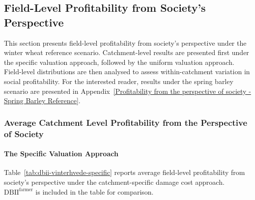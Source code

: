 \documentclass[12pt]{article}
\begin{document}
\subsection{Field-Level Profitability from Society's Perspective}
\label{sec:society-profitability}

This section presents field-level profitability from society's perspective under the winter wheat reference scenario. 
Catchment-level results are presented first under the specific valuation approach, followed by the uniform valuation approach. Field-level distributions are then analysed to assess within-catchment variation in social profitability. For the interested reader, results under the spring barley scenario are presented in Appendix~\ref{Profitability from the perspective of society - Spring Barley Reference}.


\subsubsection{Average Catchment Level Profitability from the Perspective of Society}

\paragraph{The Specific Valuation Approach} Table~\ref{tab:dbii-vinterhvede-specific} reports average field-level profitability from society's perspective under the catchment-specific damage cost approach. $\mathrm{DBII^{farmer}}$ is included in the table for comparison. 
\end{document}

